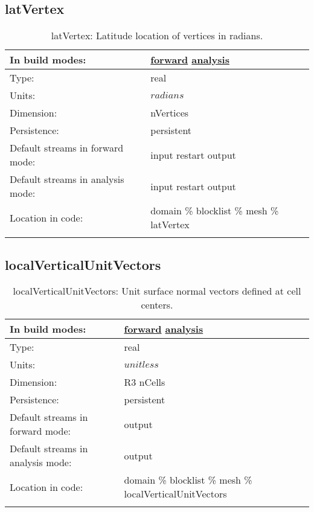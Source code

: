 \subsection[latVertex]{latVertex}
\label{subsec:var_sec_mesh_latVertex}
\begin{center}
\begin{longtable}{| p{2.0in} | p{4.0in} |}
        \hline 
        In build modes: & \hyperref[subsec:forward_var_tab_mesh]{forward} \hyperref[subsec:analysis_var_tab_mesh]{analysis} \\
        \hline 
        Type: & real \\
        \hline 
        Units: & $radians$ \\
        \hline 
        Dimension: & nVertices \\
        \hline 
        Persistence: & persistent \\
        \hline 
		 Default streams in forward mode: &  input restart output \\
        \hline 
		 Default streams in analysis mode: &  input restart output \\
        \hline 
		 Location in code: & domain \% blocklist \% mesh \% latVertex \\
		 \hline 
    \caption{latVertex: Latitude location of vertices in radians.}
\end{longtable}
\end{center}
\subsection[localVerticalUnitVectors]{localVerticalUnitVectors}
\label{subsec:var_sec_mesh_localVerticalUnitVectors}
\begin{center}
\begin{longtable}{| p{2.0in} | p{4.0in} |}
        \hline 
        In build modes: & \hyperref[subsec:forward_var_tab_mesh]{forward} \hyperref[subsec:analysis_var_tab_mesh]{analysis} \\
        \hline 
        Type: & real \\
        \hline 
        Units: & $unitless$ \\
        \hline 
        Dimension: & R3 nCells \\
        \hline 
        Persistence: & persistent \\
        \hline 
		 Default streams in forward mode: &  output \\
        \hline 
		 Default streams in analysis mode: &  output \\
        \hline 
		 Location in code: & domain \% blocklist \% mesh \% localVerticalUnitVectors \\
		 \hline 
    \caption{localVerticalUnitVectors: Unit surface normal vectors defined at cell centers.}
\end{longtable}
\end{center}
